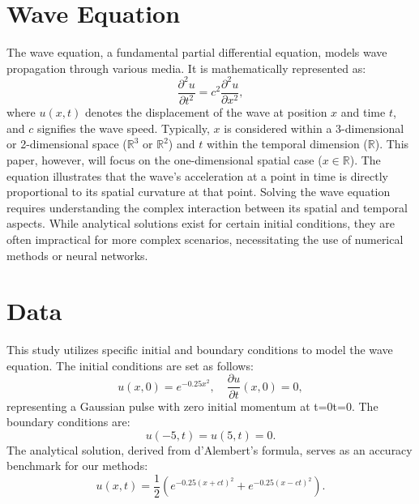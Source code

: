 \documentclass[twoside,11pt]{report}
\begin{document}
\section{Wave Equation}
\label{sec:wave}

    The wave equation, a fundamental partial differential equation, models wave propagation through 
    various media. It is mathematically represented as:
    \begin{equation}
    \frac{\partial^2 u}{\partial t^2} = c^2 \frac{\partial^2 u}{\partial x^2},
    \end{equation}
    where $u(x,t)$ denotes the displacement of the wave at position $x$ and time $t$, and $c$  
    signifies the wave speed. Typically, $x$ is considered within a 3-dimensional or 2-dimensional 
    space ($\mathbb{R}^3$ or $\mathbb{R}^2$) and $t$ within the temporal dimension ($\mathbb{R}$). 
    This paper, however, will focus on the one-dimensional spatial case ($x \in \mathbb{R}$).
    The equation illustrates that the wave's acceleration at a point in time is directly proportional to 
    its spatial curvature at that point. Solving the wave equation requires understanding the complex 
    interaction between its spatial and temporal aspects. While analytical solutions exist for certain 
    initial conditions, they are often impractical for more complex scenarios, necessitating the use of 
    numerical methods or neural networks.

\section{Data}
\label{sec:data}

    This study utilizes specific initial and boundary conditions to model the wave equation. 
    The initial conditions are set as follows:
    \begin{equation}
    u(x,0) = e^{-0.25x^2},
    \quad \frac{\partial u}{\partial t}(x,0) = 0,
    \end{equation}
    representing a Gaussian pulse with zero initial momentum at t=0t=0. 
    The boundary conditions are:
    \begin{equation}
    u(-5,t) = u(5,t) = 0.
    \end{equation}
    The analytical solution, derived from d'Alembert’s formula, serves as an accuracy benchmark for our methods:
    \begin{equation}
    u(x,t) = \frac{1}{2}(e^{-0.25(x+ct)^2} + e^{-0.25(x-ct)^2}).
    \end{equation}
\end{document}
